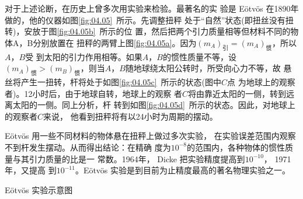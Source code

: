对于上述论断，在历史上曾多次用实验来检验。最著名的实
验是 E\"otv\"os 在1890年做的，他的仪器如图\ref{fig:04.05}~所示。先调整扭秤
处于“自然”状态(即扭丝没有扭转)，安放于图\ref{fig:04.05b}~所示的位
置，然后把两个引力质量相等但材料不同的物体A，B分别放置在
扭秤的两臂上\lhbrak 图\ref{fig:04.05a}\rhbrak 。因为$(m _ { A }) _ {\text{引}} = (m _ { A }) _ {\text{惯}} $，所以$ A $，$ B $受
到太阳的引力作用相等。如果$ A $，$ B $的惯性质量不等，设$  (m _ { A }) _ {\text{惯}}  > (m _ { B }) _ {\text{惯}} $，则当$ A $，$ B $随地球绕太阳公转时，所受向心力不等，故
悬丝将产生一扭转，杆将处于如图\ref{fig:04.05c}~所示的状态(图中$ C $点
为地球上的观察者)。12小时后，由于地球自转，地球上的观察
者$ C $将由靠近太阳的一侧，转到远离太阳的一侧。同上分析，杆
转到如图\ref{fig:04.05d}~所示的状态。因此，对地球上的观察者$ C $来说，
他看到扭秤将有以24小时为周期的摆动。

E\"otv\"os 用一些不同材料的物体悬在扭秤上做过多次实验，
在实验误差范围内观察不到杆发生摆动。从而得出结论：在精确
度为$  1 0 ^ { - 8 }   $的范围内，各种物体的惯性质量与其引力质量的比是一
常数。1964年， Dicke 把实验精度提高到$  1 0 ^ { - 1 0 }  $， 1971 年，又提高
到$  1 0 ^ { - 1 1 }  $。E\"otv\"os 实验是到目前为止精度最高的著名物理实验之一。
\begin{figurex}[t]
	\centering
	 \qquad
	 \qquad
	\caption{E\"otv\"os 实验示意图}
	\label{fig:04.05}
\end{figurex}

